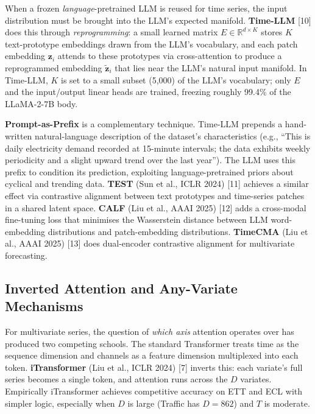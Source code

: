 When a frozen \emph{language}-pretrained LLM is reused for time series, the input distribution must be brought into the LLM's expected manifold. \textbf{Time-LLM} {[}10{]} does this through \emph{reprogramming}: a small learned matrix \(E \in \mathbb{R}^{d \times K}\) stores \(K\) text-prototype embeddings drawn from the LLM's vocabulary, and each patch embedding \(\mathbf{z}_i\) attends to these prototypes via cross-attention to produce a reprogrammed embedding \(\tilde{\mathbf{z}}_i\) that lies near the LLM's natural input manifold. In Time-LLM, \(K\) is set to a small subset (5,000) of the LLM's vocabulary; only \(E\) and the input/output linear heads are trained, freezing roughly 99.4\% of the LLaMA-2-7B body.

\textbf{Prompt-as-Prefix} is a complementary technique. Time-LLM prepends a hand-written natural-language description of the dataset's characteristics (e.g., ``This is daily electricity demand recorded at 15-minute intervals; the data exhibits weekly periodicity and a slight upward trend over the last year''). The LLM uses this prefix to condition its prediction, exploiting language-pretrained priors about cyclical and trending data. \textbf{TEST} (Sun et al., ICLR 2024) {[}11{]} achieves a similar effect via contrastive alignment between text prototypes and time-series patches in a shared latent space. \textbf{CALF} (Liu et al., AAAI 2025) {[}12{]} adds a cross-modal fine-tuning loss that minimises the Wasserstein distance between LLM word-embedding distributions and patch-embedding distributions. \textbf{TimeCMA} (Liu et al., AAAI 2025) {[}13{]} does dual-encoder contrastive alignment for multivariate forecasting.

\subsection{Inverted Attention and Any-Variate Mechanisms}\label{inverted-attention-and-any-variate-mechanisms}

For multivariate series, the question of \emph{which axis} attention operates over has produced two competing schools. The standard Transformer treats time as the sequence dimension and channels as a feature dimension multiplexed into each token. \textbf{iTransformer} (Liu et al., ICLR 2024) {[}7{]} inverts this: each variate's full series becomes a single token, and attention runs across the \(D\) variates. Empirically iTransformer achieves competitive accuracy on ETT and ECL with simpler logic, especially when \(D\) is large (Traffic has \(D=862\)) and \(T\) is moderate.

